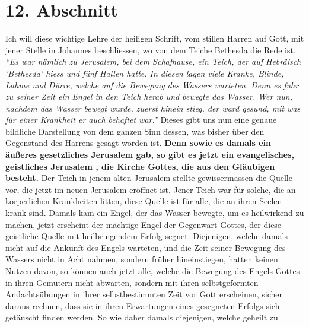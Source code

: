 \section{12. Abschnitt} \label{kap6_ab12}

\label{ref:06_12_wahre_kirche}
Ich will diese wichtige Lehre der heiligen Schrift, vom stillen Harren auf Gott,
mit jener Stelle in Johannes beschliessen, wo von dem Teiche Bethesda
die Rede ist.
\textit{"`Es war nämlich zu Jerusalem, bei dem Schafhause, ein Teich, der
auf Hebräisch 'Bethesda' hiess und fünf Hallen hatte. In diesen lagen viele
Kranke, Blinde, Lahme und Dürre, welche auf die Bewegung des Wassers warteten.
Denn es fuhr zu seiner Zeit ein Engel in den Teich herab und bewegte das
Wasser. Wer nun, nachdem das Wasser bewegt wurde, zuerst hinein stieg, der ward
gesund, mit was für einer Krankheit er auch behaftet war."'}
Dieses gibt uns nun eine genaue bildliche Darstellung von dem ganzen Sinn
dessen, was bisher über den Gegenstand des Harrens gesagt worden ist.
\textbf{Denn sowie
es damals ein äußeres gesetzliches Jerusalem
gab, so gibt es jetzt ein
evangelisches, geistliches Jerusalem
, die Kirche Gottes, die aus
den Gläubigen
besteht.} Der Teich in jenem alten Jerusalem
stellte gewissermassen die Quelle
vor, die jetzt im neuen Jerusalem eröffnet ist.
Jener Teich war für solche, die
an körperlichen Krankheiten litten, diese Quelle ist für alle, die an ihren
Seelen krank sind. Damals kam ein Engel, der das Wasser bewegte, um es
heilwirkend zu machen, jetzt erscheint der mächtige Engel
 der
Gegenwart Gottes,
der diese geistliche Quelle mit heilbringendem Erfolg
segnet. Diejenigen,
welche damals nicht auf die Ankunft des Engels warteten, und die Zeit seiner
Bewegung des Wassers nicht in Acht nahmen, sondern früher hineinstiegen, hatten
keinen Nutzen davon, so können auch jetzt alle, welche die Bewegung des Engels
Gottes in ihren Gemütern nicht abwarten, sondern mit ihren selbstgeformten
Andachtsübungen in ihrer selbstbestimmten Zeit vor Gott erscheinen, sicher
daraus rechnen, dass sie in ihren Erwartungen eines gesegneten Erfolgs sich
getäuscht finden werden. So wie daher damals diejenigen, welche geheilt zu
